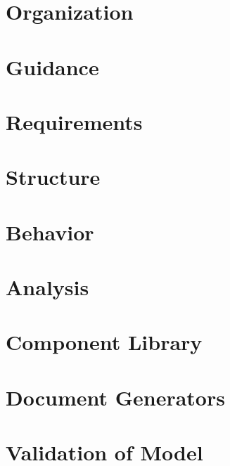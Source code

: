 \documentclass[12pt,letterpaper,oneside]{book}
\begin{document}
    	\section{Organization}
        \label{Organization}
        

    	\section{Guidance}
        \label{Guidance}
        
        
    	\section{Requirements}
        \label{Requirements}
        
        
    	\section{Structure}
        \label{Structure}
        
        
    	\section{Behavior}
        \label{Behavior}
        
        
    	\section{Analysis}
        \label{Analysis}
        
        
        \section{Component Library}
        \label{ComponentLibrary}
        
        
        \section{Document Generators}
        \label{DocGenerators}
        
        
        \section{Validation of Model}
        \label{ValidationOfModel}
        
        
\end{document}
